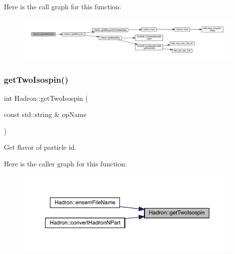Here is the call graph for this function\+:\nopagebreak
\begin{figure}[H]
\begin{center}
\leavevmode
\includegraphics[width=350pt]{d1/daf/namespaceHadron_a660c9f3adc1525c9d326b23398d09494_cgraph}
\end{center}
\end{figure}
\mbox{\label{namespaceHadron_a28f936e0038f56334a16574038c9aa0b}} 
\subsubsection{\texorpdfstring{getTwoIsospin()}{getTwoIsospin()}}
{\footnotesize\ttfamily int Hadron\+::get\+Two\+Isospin (\begin{DoxyParamCaption}\item[{const std\+::string \&}]{op\+Name }\end{DoxyParamCaption})}



Get flavor of particle id. 

Here is the caller graph for this function\+:\nopagebreak
\begin{figure}[H]
\begin{center}
\leavevmode
\includegraphics[width=350pt]{d1/daf/namespaceHadron_a28f936e0038f56334a16574038c9aa0b_icgraph}
\end{center}
\end{figure}
\mbox{\label{namespaceHadron_ab7c3962155ebb71e6377424d11c29daa}} 
